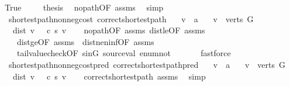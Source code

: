 \begin{isabellebody}
\isanewline
{}\isamarkupfalse%
\ True\ \isanewline
\ \ \isamarkupfalse%
\ {\isacharquery}thesis\ \isamarkupfalse%
\ no{\isacharunderscore}path{\isacharbrackleft}OF\ assms{\isacharbrackright}\ \isamarkupfalse%
\ simp\isanewline
{}\isamarkupfalse%
%
\endisatagproof
{\isafoldproof}%
%
\isadelimproof
\isanewline
%
\endisadelimproof
\isanewline
{}\isamarkupfalse%
\ {\isacharparenleft}\ shortest{\isacharunderscore}path{\isacharunderscore}non{\isacharunderscore}neg{\isacharunderscore}cost{\isacharparenright}\ correct{\isacharunderscore}shortest{\isacharunderscore}path{\isacharcolon}\isanewline
\ \ \ v\ {\isacharcolon}{\isacharcolon}\ {\isacharprime}a\isanewline
\ \ \ {\isachardoublequoteopen}v\ {\isasymin}\ verts\ G{\isachardoublequoteclose}\isanewline
\ \ \ {\isachardoublequoteopen}dist\ v\ {\isacharequal}\ {\isasymmu}\ c\ s\ v{\isachardoublequoteclose}\isanewline
%
\isadelimproof
\ \ %
\endisadelimproof
%
\isatagproof
{}\isamarkupfalse%
\ no{\isacharunderscore}path{\isacharbrackleft}OF\ assms{\isacharparenleft}{}{\isacharparenright}{\isacharbrackright}\ dist{\isacharunderscore}le{\isacharunderscore}{\isasymmu}{\isacharbrackleft}OF\ assms{\isacharparenleft}{}{\isacharparenright}{\isacharbrackright}\isanewline
\ \ \ \ dist{\isacharunderscore}ge{\isacharunderscore}{\isasymmu}{\isacharbrackleft}OF\ assms{\isacharparenleft}{}{\isacharparenright}\ {\isacharunderscore}\ dist{\isacharunderscore}ne{\isacharunderscore}ninf{\isacharbrackleft}OF\ assms{\isacharparenleft}{}{\isacharparenright}{\isacharbrackright}\ \isanewline
\ \ \ \ tail{\isacharunderscore}value{\isacharunderscore}check{\isacharbrackleft}OF\ s{\isacharunderscore}in{\isacharunderscore}G{\isacharbrackright}\ source{\isacharunderscore}val\ enum{\isacharunderscore}not{}{\isacharbrackright}\ \isanewline
\ \ \ \ \isamarkupfalse%
\ fastforce%
\endisatagproof
{\isafoldproof}%
%
\isadelimproof
\isanewline
%
\endisadelimproof
\isanewline
{}\isamarkupfalse%
\ {\isacharparenleft}\ shortest{\isacharunderscore}path{\isacharunderscore}non{\isacharunderscore}neg{\isacharunderscore}cost{\isacharunderscore}pred{\isacharparenright}\ correct{\isacharunderscore}shortest{\isacharunderscore}path{\isacharunderscore}pred{\isacharcolon}\isanewline
\ \ \ v\ {\isacharcolon}{\isacharcolon}\ {\isacharprime}a\isanewline
\ \ \ {\isachardoublequoteopen}v\ {\isasymin}\ verts\ G{\isachardoublequoteclose}\isanewline
\ \ \ {\isachardoublequoteopen}dist\ v\ {\isacharequal}\ {\isasymmu}\ c\ s\ v{\isachardoublequoteclose}\isanewline
%
\isadelimproof
\ \ %
\endisadelimproof
%
\isatagproof
{}\isamarkupfalse%
\ correct{\isacharunderscore}shortest{\isacharunderscore}path\ assms\ \isamarkupfalse%
\ simp%
\endisatagproof
{\isafoldproof}%
%
\isadelimproof
\isanewline
%
\endisadelimproof
%
\isadelimtheory
\isanewline
%
\endisadelimtheory
%
\isatagtheory
{}\isamarkupfalse%
%
\endisatagtheory
{\isafoldtheory}%
%
\isadelimtheory
%
\endisadelimtheory
\end{isabellebody}%
